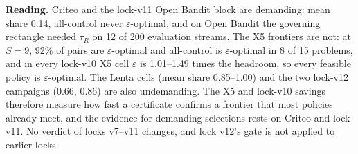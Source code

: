 \documentclass[sigconf,anonymous,review]{acmart}
\newcommand{\eps}{\varepsilon}
\begin{document}
\textbf{Reading.} Criteo and the lock-v11 Open Bandit block are demanding: mean share 0.14, all-control never $\eps$-optimal, and on Open Bandit the governing rectangle needed $\tau_R$ on 12 of 200 evaluation streams. The X5 frontiers are not: at $S = 9$, 92\% of pairs are $\eps$-optimal and all-control is $\eps$-optimal in 8 of 15 problems, and in every lock-v10 X5 cell $\eps$ is 1.01--1.49 times the headroom, so every feasible policy is $\eps$-optimal. The Lenta cells (mean share 0.85--1.00) and the two lock-v12 campaigns (0.66, 0.86) are also undemanding. The X5 and lock-v10 savings therefore measure how fast a certificate confirms a frontier that most policies already meet, and the evidence for demanding selections rests on Criteo and lock v11. No verdict of locks v7--v11 changes, and lock v12's gate is not applied to earlier locks.
\end{document}

